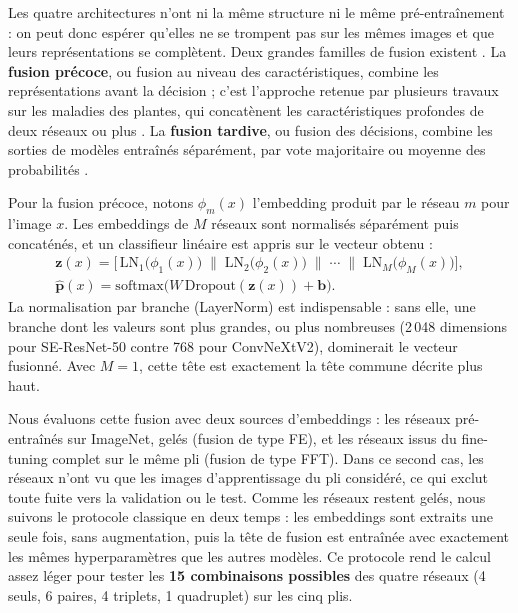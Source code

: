 Les quatre architectures n'ont ni la même structure ni le même pré-entraînement : on peut donc espérer qu'elles ne se trompent pas sur les mêmes images et que leurs représentations se complètent. Deux grandes familles de fusion existent \cite{snoek2005early}. La \textbf{fusion précoce}, ou fusion au niveau des caractéristiques, combine les représentations avant la décision ; c'est l'approche retenue par plusieurs travaux sur les maladies des plantes, qui concatènent les caractéristiques profondes de deux réseaux ou plus \cite{khan2018ccdf, ji2020unitedmodel, sutaji2022lemoxinet}. La \textbf{fusion tardive}, ou fusion des décisions, combine les sorties de modèles entraînés séparément, par vote majoritaire ou moyenne des probabilités \cite{turkoglu2022plantdiseasenet}.

Pour la fusion précoce, notons $\phi_m(x)$ l'embedding produit par le réseau $m$ pour l'image $x$. Les embeddings de $M$ réseaux sont normalisés séparément puis concaténés, et un classifieur linéaire est appris sur le vecteur obtenu :
\begin{gather}
\mathbf{z}(x) = \Big[\, \mathrm{LN}_1\big(\phi_1(x)\big) \;\|\; \mathrm{LN}_2\big(\phi_2(x)\big) \;\|\; \cdots \;\|\; \mathrm{LN}_M\big(\phi_M(x)\big) \Big], \label{eq:fusion}\\
\hat{\mathbf{p}}(x) = \mathrm{softmax}\big(W\,\mathrm{Dropout}(\mathbf{z}(x)) + \mathbf{b}\big). \label{eq:fusion-head}
\end{gather}
La normalisation par branche (LayerNorm) est indispensable : sans elle, une branche dont les valeurs sont plus grandes, ou plus nombreuses (2\,048 dimensions pour SE-ResNet-50 contre 768 pour ConvNeXtV2), dominerait le vecteur fusionné. Avec $M=1$, cette tête est exactement la tête commune décrite plus haut.

Nous évaluons cette fusion avec deux sources d'embeddings : les réseaux pré-entraînés sur ImageNet, gelés (fusion de type FE), et les réseaux issus du fine-tuning complet sur le même pli (fusion de type FFT). Dans ce second cas, les réseaux n'ont vu que les images d'apprentissage du pli considéré, ce qui exclut toute fuite vers la validation ou le test. Comme les réseaux restent gelés, nous suivons le protocole classique en deux temps : les embeddings sont extraits une seule fois, sans augmentation, puis la tête de fusion est entraînée avec exactement les mêmes hyperparamètres que les autres modèles. Ce protocole rend le calcul assez léger pour tester les \textbf{15 combinaisons possibles} des quatre réseaux (4 seuls, 6 paires, 4 triplets, 1 quadruplet) sur les cinq plis.

